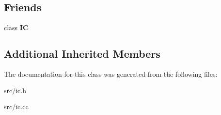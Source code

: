 \subsection*{Friends}
\begin{DoxyCompactItemize}
\item 
\hypertarget{classv8_1_1internal_1_1_compare_i_c_ae59e849648858af1fd22081890d47b78}{}class {\bfseries I\+C}\label{classv8_1_1internal_1_1_compare_i_c_ae59e849648858af1fd22081890d47b78}

\end{DoxyCompactItemize}
\subsection*{Additional Inherited Members}


The documentation for this class was generated from the following files\+:\begin{DoxyCompactItemize}
\item 
src/ic.\+h\item 
src/ic.\+cc\end{DoxyCompactItemize}
